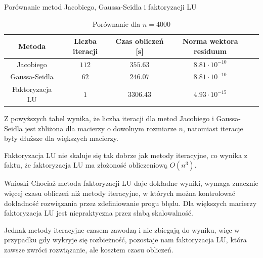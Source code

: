 \documentclass{article}
\begin{document}
\begin{section}{Porównanie metod Jacobiego, Gaussa-Seidla i faktoryzacji LU}
    \begin{table}
        \centering
        \begin{tabular}{|c|c|c|c|c|}
            \hline
            Metoda & Liczba iteracji & Czas obliczeń [s] & Norma wektora residuum \\
            \hline
            Jacobiego & $112$ & $355.63$ & $8.81\cdot10^{-10}$ \\
            Gaussa-Seidla & $62$ & $246.07$ & $8.81\cdot10^{-10}$ \\
            Faktoryzacja LU & $1$ & $3306.43$ & $4.93\cdot10^{-15}$ \\
            \hline
        \end{tabular}
        \caption{Porównanie dla $n = 4000$}
    \end{table}

    Z powyższych tabel wynika, że liczba iteracji dla metod Jacobiego i Gaussa-Seidla jest zbliżona dla
    macierzy o dowolnym rozmiarze $n$, natomiast iteracje były dłuższe dla większych macierzy.

    Faktoryzacja LU nie skaluje się tak dobrze jak metody iteracyjne, co wynika z faktu, że faktoryzacja LU
    ma złożoność obliczeniową $O(n^3)$. 
\end{section}

\begin{section}{Wnioski}
    Chociaż metoda faktoryzacji LU daje dokładne wyniki, wymaga znacznie więcej czasu obliczeń niż metody iteracyjne,
    w których można kontrolować dokładność rozwiązania przez zdefiniowanie progu błędu. Dla większych macierzy
    faktoryzacja LU jest niepraktyczna przez słabą skalowalność. 

    Jednak metody iteracyjne czasem zawodzą i nie zbiegają do wyniku, więc w przypadku gdy wykryje się rozbieżność,
    pozostaje nam faktoryzacja LU, która zawsze zwróci rozwiązanie, ale kosztem czasu obliczeń.
\end{section}

\printbibliography
\end{document}

